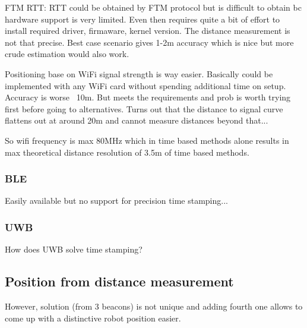 FTM RTT: RTT could be obtained by FTM protocol but is difficult to obtain bc hardware support is very limited. Even then requires quite a bit of effort to install required driver, firmaware, kernel version. The distance measurement is not that precise. Best case scenario gives 1-2m accuracy which is nice but more crude estimation would also work.

Positioning base on WiFi signal strength is way easier. Basically could be implemented with any WiFi card without spending additional time on setup. Accuracy is worse ~10m. But meets the requirements and prob is worth trying first before going to alternatives. Turns out that the distance to signal curve flattens out at around 20m and cannot measure distances beyond that...

So wifi frequency is max 80MHz which in time based methods alone results in max theoretical distance resolution of 3.5m of time based methods.




\subsubsection{BLE}

Easily available but no support for precision time stamping...

\subsubsection{UWB}

How does UWB solve time stamping?


\subsection{Position from distance measurement}

However, solution (from 3 beacons) is not unique and adding fourth one allows to come up with a distinctive robot position easier.